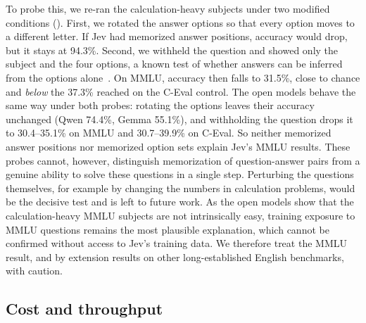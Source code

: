 \documentclass[table]{article}
\begin{document}
To probe this, we re-ran the calculation-heavy subjects under two modified conditions (). First, we rotated the answer options so that every option moves to a different letter. If Jev had memorized answer positions, accuracy would drop, but it stays at 94.3\%. Second, we withheld the question and showed only the subject and the four options, a known test of whether answers can be inferred from the options alone~\cite{balepur-etal-2024-artifacts}. On MMLU, accuracy then falls to 31.5\%, close to chance and \emph{below} the 37.3\% reached on the C-Eval control. The open models behave the same way under both probes: rotating the options leaves their accuracy unchanged (Qwen 74.4\%, Gemma 55.1\%), and withholding the question drops it to 30.4--35.1\% on MMLU and 30.7--39.9\% on C-Eval. So neither memorized answer positions nor memorized option sets explain Jev's MMLU results. 
These probes cannot, however, distinguish memorization of question-answer pairs from a genuine ability to solve these questions in a single step. Perturbing the questions themselves, for example by changing the numbers in calculation problems, would be the decisive test and is left to future work. As the open models show that the calculation-heavy MMLU subjects are not intrinsically easy, training exposure to MMLU questions remains the most plausible explanation, which cannot be confirmed without access to Jev's training data. We therefore treat the MMLU result, and by extension results on other long-established English benchmarks, with caution.

\subsection{Cost and throughput}

\begin{table}[t]
\centering
\caption{Requests, input tokens, cost and mean client-side latency per request (at 32 concurrent requests) for the evaluation run, by category. Requests counts unique requests sent during the evaluation run. Identical items (1,911 duplicates across 17 datasets) are sent once and scored for every occurrence; 4 items had already been answered in the development pilot and 1 over-long BIG-bench item was rejected.}
\label{tab:cost}
\footnotesize
\setlength{\tabcolsep}{4pt}

\end{table}
\end{document}
